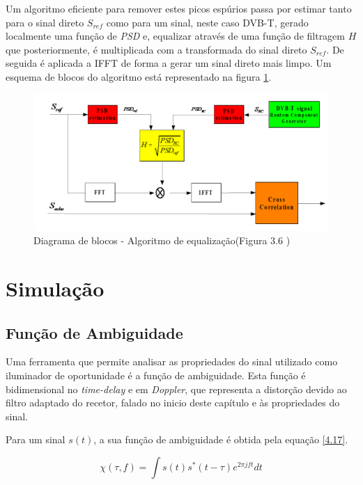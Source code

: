 Um algoritmo eficiente para remover estes picos espúrios passa por estimar tanto para o sinal direto $S_{ref}$ como para um sinal, neste caso \gls{DVB-T}, gerado localmente uma função de \textit{\gls{PSD}} e, equalizar através de uma função de filtragem $H$ que posteriormente, é multiplicada com a transformada do sinal direto $S_{ref}$. De seguida é aplicada a \gls{IFFT} de forma a gerar um sinal direto mais limpo. Um esquema de blocos do algoritmo está representado na figura \ref{fig:equal}.

\begin{figure}[h]
\centering
\includegraphics[scale=0.5]{chapters/ch4/assets/equal}
\caption[Diagrama de blocos - Algoritmo de equalização]{Diagrama de blocos - Algoritmo de equalização(Figura 3.6 \cite{Martorella})}
\label{fig:equal}
\end{figure}



\section{Simulação}

\subsection{Função de Ambiguidade}
Uma ferramenta que permite analisar as propriedades do sinal utilizado como iluminador de oportunidade é a função de ambiguidade. Esta função é bidimensional no \textit{time-delay} e em \textit{Doppler}, que representa a distorção devido ao filtro adaptado do recetor, falado no inicio deste capítulo e às propriedades do sinal.\par 
Para um sinal $s(t)$, a sua função de ambiguidade é obtida pela equação \ref{4.17}.

\begin{equation} \label{4.17}
\chi\left( \tau,f\right) =\int s\left( t\right)s^{\ast}\left( t-\tau\right)e^{2\pi jft}dt
\end{equation}

